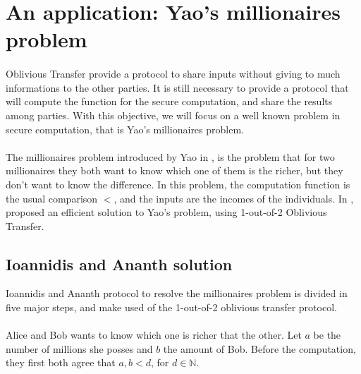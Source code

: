 \documentclass[11pt,a4paper]{article}
\begin{document}
\section{An application: Yao's millionaires problem}

\paragraph{}

Oblivious Transfer provide a protocol  to share inputs without
giving to much informations to the other parties. It is
still necessary to provide a protocol that will
compute the function for the secure computation, and share
the results among parties. With this objective, we will
focus on a well known problem in secure computation, that
is Yao's millionaires problem.

\paragraph{}

The millionaires problem introduced by Yao in
\cite{yao_protocols_1982}, is the problem that for two millionaires
they both want to know which one of them is the richer, but they
don't want to know the difference. In this problem, the computation
function is the usual comparison $<$, and the inputs are the incomes of
the individuals. In \cite{hutchison_efficient_2005},
proposed an efficient solution to Yao's problem, using 1-out-of-2
Oblivious Transfer.


\subsection{Ioannidis and Ananth solution}

Ioannidis and Ananth protocol to
resolve
the millionaires problem \cite{ioannidis_efficient_2003}
is divided in five major steps, and make
used of the 1-out-of-2 oblivious transfer protocol.

\paragraph{}

Alice and Bob wants to know which one is richer that the other.
Let $a$ be the number of millions she posses and $b$ the amount
of Bob. Before the computation, they first both agree
that $a, b < d$, for $d \in \mathbb{N}$.

\paragraph{}
\end{document}
